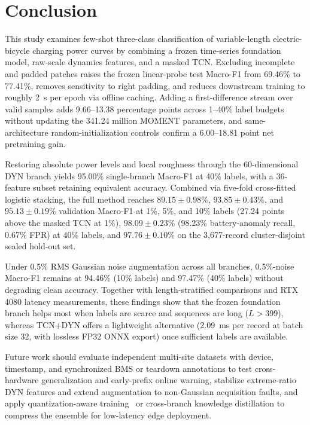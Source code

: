 \documentclass{iopjournal}
\begin{document}
\section{Conclusion}\label{sec:conclusion}

This study examines few-shot three-class classification of variable-length electric-bicycle charging power curves by combining a frozen time-series foundation model, raw-scale dynamics features, and a masked TCN. Excluding incomplete and padded patches raises the frozen linear-probe test Macro-F1 from 69.46\% to 77.41\%, removes sensitivity to right padding, and reduces downstream training to roughly 2~s per epoch via offline caching. Adding a first-difference stream over valid samples adds 9.66--13.38 percentage points across 1--40\% label budgets without updating the 341.24 million MOMENT parameters, and same-architecture random-initialization controls confirm a 6.00--18.81 point net pretraining gain.

Restoring absolute power levels and local roughness through the 60-dimensional DYN branch yields 95.00\% single-branch Macro-F1 at 40\% labels, with a 36-feature subset retaining equivalent accuracy. Combined via five-fold cross-fitted logistic stacking, the full method reaches $89.15\pm0.98\%$, $93.85\pm0.43\%$, and $95.13\pm0.19\%$ validation Macro-F1 at 1\%, 5\%, and 10\% labels (27.24 points above the masked TCN at 1\%), $98.09\pm0.23\%$ (98.23\% battery-anomaly recall, 0.67\% FPR) at 40\% labels, and $97.76\pm0.10\%$ on the 3,677-record cluster-disjoint sealed hold-out set.

Under 0.5\% RMS Gaussian noise augmentation across all branches, 0.5\%-noise Macro-F1 remains at 94.46\% (10\% labels) and 97.47\% (40\% labels) without degrading clean accuracy. Together with length-stratified comparisons and RTX 4080 latency measurements, these findings show that the frozen foundation branch helps most when labels are scarce and sequences are long ($L>399$), whereas TCN+DYN offers a lightweight alternative (2.09~ms per record at batch size 32, with lossless FP32 ONNX export) once sufficient labels are available.

Future work should evaluate independent multi-site datasets with device, timestamp, and synchronized BMS or teardown annotations to test cross-hardware generalization and early-prefix online warning, stabilize extreme-ratio DYN features and extend augmentation to non-Gaussian acquisition faults, and apply quantization-aware training~\cite{jacob2018} or cross-branch knowledge distillation to compress the ensemble for low-latency edge deployment.
\end{document}
